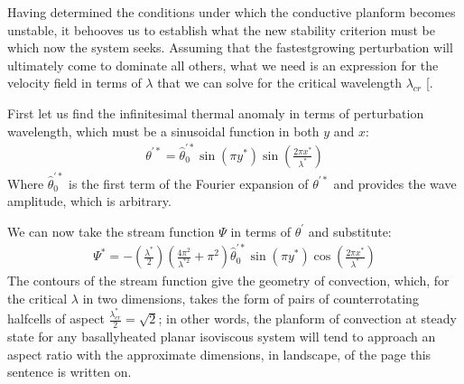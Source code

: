 \documentclass[letterpaper,10pt,english]{jupyterBook}
\begin{document}
\sphinxAtStartPar
Having determined the conditions under which the conductive planform becomes unstable, it behooves us to establish what the new stability criterion must be which now the system seeks. Assuming that the fastest\sphinxhyphen{}growing perturbation will ultimately come to dominate all others, what we need is an expression for the velocity field in terms of \(\lambda\) that we can solve for the critical wavelength \(\lambda_{cr}\) {[}\sphinxcite{references:id76}{]}.

\sphinxAtStartPar
First let us find the infinitesimal thermal anomaly in terms of perturbation wavelength, which must be a sinusoidal function in both \(y\) and \(x\):
\begin{equation*}
\begin{split} \theta^{'*} = \widehat{\theta}_0^{'*} \sin \left( \pi y^* \right) \sin \left( \frac{2 \pi x^*}{\lambda^*} \right) \end{split}
\end{equation*}
\sphinxAtStartPar
Where \(\widehat{\theta}_0^{'*}\) is the first term of the Fourier expansion of \(\theta^{'*}\) and provides the wave amplitude, which is arbitrary.

\sphinxAtStartPar
We can now take the stream function \(\Psi\) in terms of \(\theta^{'}\) and substitute:
\begin{equation*}
\begin{split} \Psi^* = - \left( \frac{\lambda^*}{2} \right) \left( \frac{4\pi^2}{\lambda^{*2}} + \pi^2 \right) \widehat{\theta}_0^{'*} \sin \left( \pi y^* \right) \cos \left( \frac{2 \pi x^*}{\lambda^*} \right) \end{split}
\end{equation*}
\sphinxAtStartPar
The contours of the stream function give the geometry of convection, which, for the critical \(\lambda\) in two dimensions, takes the form of pairs of counter\sphinxhyphen{}rotating half\sphinxhyphen{}cells of aspect \(\frac{\lambda_{cr}^*}{2}=\sqrt{2}\); in other words, the planform of convection at steady state for any basally\sphinxhyphen{}heated planar isoviscous system will tend to approach an aspect ratio with the approximate dimensions, in landscape, of the page this sentence is written on.
\end{document}
